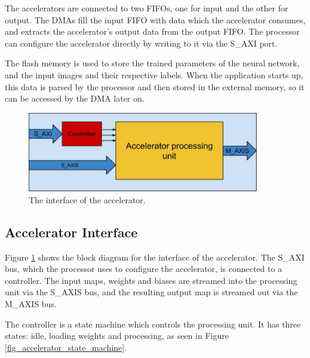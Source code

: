 The accelerators are connected to two FIFOs, one for input and the other for output. The DMAs fill the input FIFO with data which the accelerator consumes, and extracts the accelerator's output data from the output FIFO. The processor can configure the accelerator directly by writing to it via the S\_AXI port.

The flash memory is used to store the trained parameters of the neural network, and the input images and their respective labels. When the application starts up, this data is parsed by the processor and then stored in the external memory, so it can be accessed by the DMA later on.  



\begin{figure}[h!]
  \centering
      \includegraphics[width=0.9\textwidth]{Figures/Method/accelerator_interface}
    \caption{The interface of the accelerator.}
    \label{fig_accelerator_interface}
\end{figure}


\subsection{Accelerator Interface}

Figure \ref{fig_accelerator_interface} shows the block diagram for the interface of the accelerator. The S\_AXI bus, which the processor uses to configure the accelerator, is connected to a controller. The input maps, weights and biases are streamed into the processing unit via the S\_AXIS bus, and the resulting output map is streamed out via the M\_AXIS bus.

The controller is a state machine which controls the processing unit. It has three states: idle, loading weights and processing, as seen in Figure \ref{fig_accelerator_state_machine}. 

